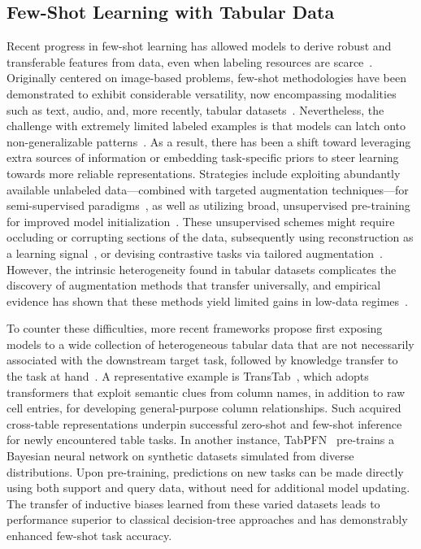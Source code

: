 \subsection{Few-Shot Learning with Tabular Data} Recent progress in few-shot learning has allowed models to derive robust and transferable features from data, even when labeling resources are scarce~\cite{chen2018closer}. Originally centered on image-based problems, few-shot methodologies have been demonstrated to exhibit considerable versatility, now encompassing modalities such as text, audio, and, more recently, tabular datasets~\cite{majumder2022few,nam2023stunt,schick2021exploiting}. Nevertheless, the challenge with extremely limited labeled examples is that models can latch onto non-generalizable patterns~\cite{bartlett2021deep}. As a result, there has been a shift toward leveraging extra sources of information or embedding task-specific priors to steer learning towards more reliable representations. Strategies include exploiting abundantly available unlabeled data—combined with targeted augmentation techniques—for semi-supervised paradigms~\cite{ucar2021subtab,yoon2020vime}, as well as utilizing broad, unsupervised pre-training for improved model initialization~\cite{somepalli2021saint}. These unsupervised schemes might require occluding or corrupting sections of the data, subsequently using reconstruction as a learning signal~\cite{arik2021tabnet,majmundar2022met}, or devising contrastive tasks via tailored augmentation~\cite{bahri2022scarf,chen2020simple}. However, the intrinsic heterogeneity found in tabular datasets complicates the discovery of augmentation methods that transfer universally, and empirical evidence has shown that these methods yield limited gains in low-data regimes~\cite{nam2023stunt}.

To counter these difficulties, more recent frameworks propose first exposing models to a wide collection of heterogeneous tabular data that are not necessarily associated with the downstream target task, followed by knowledge transfer to the task at hand~\cite{zhang2023generative,levin2022transfer,zhu2023xtab}. A representative example is TransTab~\cite{wang2022transtab}, which adopts transformers that exploit semantic clues from column names, in addition to raw cell entries, for developing general-purpose column relationships. Such acquired cross-table representations underpin successful zero-shot and few-shot inference for newly encountered table tasks. In another instance, TabPFN~\cite{hollmann2022tabpfn} pre-trains a Bayesian neural network on synthetic datasets simulated from diverse distributions. Upon pre-training, predictions on new tasks can be made directly using both support and query data, without need for additional model updating. The transfer of inductive biases learned from these varied datasets leads to performance superior to classical decision-tree approaches and has demonstrably enhanced few-shot task accuracy.

